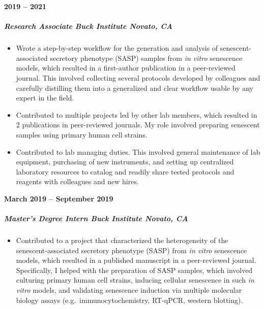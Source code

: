 \documentclass[
  letterpaper,
  DIV=11,
  numbers=noendperiod]{scrartcl}
\let\oldsubparagraph\subparagraph
\renewcommand{\subparagraph}[1]{\oldsubparagraph{#1}\mbox{}}
\providecommand{\tightlist}{%
  \setlength{\itemsep}{0pt}\setlength{\parskip}{0pt}}\usepackage{longtable,booktabs,array}
\begin{document}
\textbf{2019 -- 2021}

\hypertarget{research-associate-buck-institute-novato-ca}{%
\subparagraph{\texorpdfstring{\textbf{Research Associate \textbar{} Buck
Institute \textbar{} Novato,
CA}}{Research Associate \textbar{} Buck Institute \textbar{} Novato, CA}}\label{research-associate-buck-institute-novato-ca}}

\begin{itemize}
\item
  Wrote a step-by-step workflow for the generation and analysis of
  senescent-associated secretory phenotype (SASP) samples from \emph{in
  vitro} senescence models, which resulted in a first-author publication
  in a peer-reviewed journal. This involved collecting several protocols
  developed by colleagues and carefully distilling them into a
  generalized and clear workflow usable by any expert in the field.
\item
  Contributed to multiple projects led by other lab members, which
  resulted in 2 publications in peer-reviewed journals. My role involved
  preparing senescent samples using primary human cell strains.
\item
  Contributed to lab managing duties. This involved general maintenance
  of lab equipment, purchasing of new instruments, and setting up
  centralized laboratory resources to catalog and readily share tested
  protocols and reagents with colleagues and new hires.
\end{itemize}

\textbf{March 2019 -- September 2019}

\hypertarget{masters-degree-intern-buck-institute-novato-ca}{%
\subparagraph{\texorpdfstring{\textbf{Master's Degree Intern \textbar{}
Buck Institute \textbar{} Novato,
CA}}{Master's Degree Intern \textbar{} Buck Institute \textbar{} Novato, CA}}\label{masters-degree-intern-buck-institute-novato-ca}}

\begin{itemize}
\tightlist
\item
  Contributed to a project that characterized the heterogeneity of the
  senescent-associated secretory phenotype (SASP) from \emph{in vitro}
  senescence models, which resulted in a published manuscript in a
  peer-reviewed journal. Specifically, I helped with the preparation of
  SASP samples, which involved culturing primary human cell strains,
  inducing cellular senescence in such \emph{in vitro} models, and
  validating senescence induction via multiple molecular biology assays
  (e.g.~immunocytochemistry, RT-qPCR, western blotting).
\end{itemize}
\end{document}
